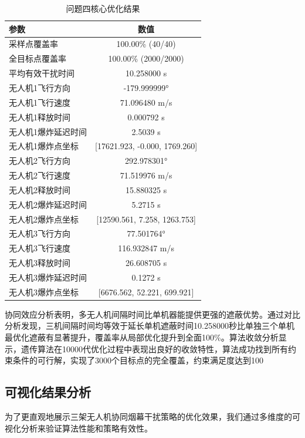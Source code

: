 \begin{table}[htbp]
\centering
\caption{问题四核心优化结果}
\label{tab:q4_combined}
\begin{tabular}{lc}
\toprule
\textbf{参数} & \textbf{数值} \\
\midrule
采样点覆盖率 & 100.00\% (40/40) \\
全目标点覆盖率 & 100.00\% (2000/2000) \\
平均有效干扰时间 & 10.258000 s \\
无人机1飞行方向 & -179.999999° \\
无人机1飞行速度 & 71.096480 m/s \\
无人机1释放时间 & 0.000792 s \\
无人机1爆炸延迟时间 & 2.5039 s \\
无人机1爆炸点坐标 & [17621.923, -0.000, 1769.260] \\
无人机2飞行方向 & 292.978301° \\
无人机2飞行速度 & 71.519976 m/s \\
无人机2释放时间 & 15.880325 s \\
无人机2爆炸延迟时间 & 5.2715 s \\
无人机2爆炸点坐标 & [12590.561, 7.258, 1263.753] \\
无人机3飞行方向 & 77.501764° \\
无人机3飞行速度 & 116.932847 m/s \\
无人机3释放时间 & 26.608705 s \\
无人机3爆炸延迟时间 & 0.1272 s \\
无人机3爆炸点坐标 & [6676.562, 52.221, 699.921] \\
\bottomrule
\end{tabular}
\end{table}

协同效应分析表明，多无人机间隔时间比单机器能提供更强的遮蔽优势。通过对比分析发现，三机间隔时间均等效于延长单机遮蔽时间10.258000秒比单独三个单机最优化遮蔽有显著提升，覆盖率从局部优化提升到全面100\%。算法收敛分析显示，遗传算法在10000代优化过程中表现出良好的收敛特性，算法成功找到所有约束条件的可行解，实现了3000个目标点的完全覆盖，约束满足度达到100%

\subsection{可视化结果分析}

为了更直观地展示三架无人机协同烟幕干扰策略的优化效果，我们通过多维度的可视化分析来验证算法性能和策略有效性。

